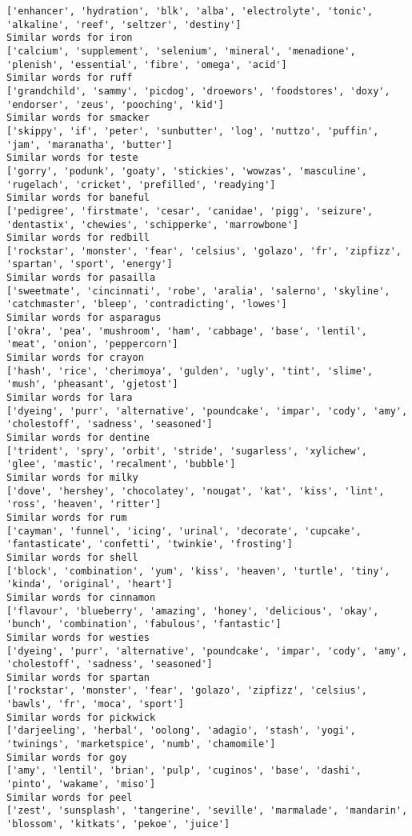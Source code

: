 \documentclass[11pt]{article}
\begin{document}
\begin{Verbatim}[commandchars=\\\{\}]
['enhancer', 'hydration', 'blk', 'alba', 'electrolyte', 'tonic', 'alkaline', 'reef', 'seltzer', 'destiny']
Similar words for iron
['calcium', 'supplement', 'selenium', 'mineral', 'menadione', 'plenish', 'essential', 'fibre', 'omega', 'acid']
Similar words for ruff
['grandchild', 'sammy', 'picdog', 'droewors', 'foodstores', 'doxy', 'endorser', 'zeus', 'pooching', 'kid']
Similar words for smacker
['skippy', 'if', 'peter', 'sunbutter', 'log', 'nuttzo', 'puffin', 'jam', 'maranatha', 'butter']
Similar words for teste
['gorry', 'podunk', 'goaty', 'stickies', 'wowzas', 'masculine', 'rugelach', 'cricket', 'prefilled', 'readying']
Similar words for baneful
['pedigree', 'firstmate', 'cesar', 'canidae', 'pigg', 'seizure', 'dentastix', 'chewies', 'schipperke', 'marrowbone']
Similar words for redbill
['rockstar', 'monster', 'fear', 'celsius', 'golazo', 'fr', 'zipfizz', 'spartan', 'sport', 'energy']
Similar words for pasailla
['sweetmate', 'cincinnati', 'robe', 'aralia', 'salerno', 'skyline', 'catchmaster', 'bleep', 'contradicting', 'lowes']
Similar words for asparagus
['okra', 'pea', 'mushroom', 'ham', 'cabbage', 'base', 'lentil', 'meat', 'onion', 'peppercorn']
Similar words for crayon
['hash', 'rice', 'cherimoya', 'gulden', 'ugly', 'tint', 'slime', 'mush', 'pheasant', 'gjetost']
Similar words for lara
['dyeing', 'purr', 'alternative', 'poundcake', 'impar', 'cody', 'amy', 'cholestoff', 'sadness', 'seasoned']
Similar words for dentine
['trident', 'spry', 'orbit', 'stride', 'sugarless', 'xylichew', 'glee', 'mastic', 'recalment', 'bubble']
Similar words for milky
['dove', 'hershey', 'chocolatey', 'nougat', 'kat', 'kiss', 'lint', 'ross', 'heaven', 'ritter']
Similar words for rum
['cayman', 'funnel', 'icing', 'urinal', 'decorate', 'cupcake', 'fantasticate', 'confetti', 'twinkie', 'frosting']
Similar words for shell
['block', 'combination', 'yum', 'kiss', 'heaven', 'turtle', 'tiny', 'kinda', 'original', 'heart']
Similar words for cinnamon
['flavour', 'blueberry', 'amazing', 'honey', 'delicious', 'okay', 'bunch', 'combination', 'fabulous', 'fantastic']
Similar words for westies
['dyeing', 'purr', 'alternative', 'poundcake', 'impar', 'cody', 'amy', 'cholestoff', 'sadness', 'seasoned']
Similar words for spartan
['rockstar', 'monster', 'fear', 'golazo', 'zipfizz', 'celsius', 'bawls', 'fr', 'moca', 'sport']
Similar words for pickwick
['darjeeling', 'herbal', 'oolong', 'adagio', 'stash', 'yogi', 'twinings', 'marketspice', 'numb', 'chamomile']
Similar words for goy
['amy', 'lentil', 'brian', 'pulp', 'cuginos', 'base', 'dashi', 'pinto', 'wakame', 'miso']
Similar words for peel
['zest', 'sunsplash', 'tangerine', 'seville', 'marmalade', 'mandarin', 'blossom', 'kitkats', 'pekoe', 'juice']

\end{Verbatim}
\end{document}
